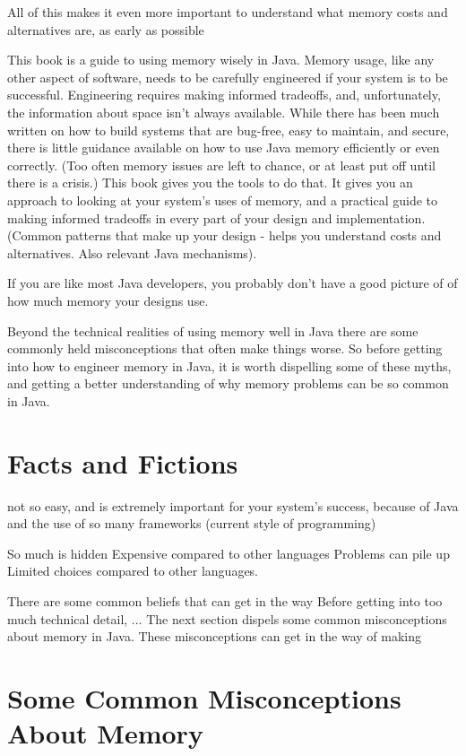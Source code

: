 All of this makes it even more important to understand what memory costs and alternatives are, as early as possible

This book is a guide to using memory wisely in Java. Memory usage, like any other
aspect of software, needs to be carefully engineered if your system is to be successful.
Engineering requires making informed tradeoffs, and, unfortunately, the information
about space isn't always available. 
While there has been much written on how to build systems that are bug-free, easy to maintain, and secure,
there is little guidance available on how to use Java memory efficiently
or even correctly. (Too often memory issues are left to chance, or at least
put off until there is a crisis.)  This book gives you the tools to do that.
It gives you 
an approach to looking at your system's uses of memory, and a practical guide
to making informed tradeoffs in every part of your design and
implementation.  (Common patterns that make up your design - helps you understand costs and alternatives.  Also 
relevant Java mechanisms).

If you are like most Java developers, you probably don't have a good picture of
of how much memory your designs use.

Beyond the technical realities of using memory well in Java there are some commonly held misconceptions that often make things worse. So before getting into how to engineer memory in Java, it is worth dispelling some
of these myths, and getting a better understanding of why memory problems
can be so common in Java.

\section{Facts and Fictions}

not so easy, and is extremely important for your system's success, because of Java and the use of so
many frameworks (current style of programming)

So much is hidden
Expensive compared to other languages
Problems can pile up
Limited choices compared to other languages.


There are some common beliefs that can get in the way 
Before getting into too much technical detail, ... The next section dispels some common misconceptions about memory in Java.  These misconceptions can get in the way of making 


\section{Some Common Misconceptions About Memory}

